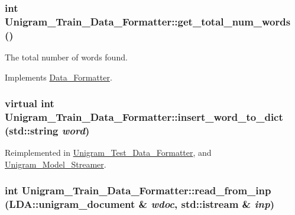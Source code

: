 \hypertarget{class_unigram___train___data___formatter_a89a89ebbf1d42f49f4e2f86307d47bb8}{
\subsubsection[{get\_\-total\_\-num\_\-words}]{\setlength{\rightskip}{0pt plus 5cm}int Unigram\_\-Train\_\-Data\_\-Formatter::get\_\-total\_\-num\_\-words ()}}
\label{class_unigram___train___data___formatter_a89a89ebbf1d42f49f4e2f86307d47bb8}


The total number of words found. 



Implements \hyperlink{class_data___formatter_aec312da75df72aa23974051db72e4b69}{Data\_\-Formatter}.

\hypertarget{class_unigram___train___data___formatter_a0023886209f7fd1441a256238c86844a}{
\subsubsection[{insert\_\-word\_\-to\_\-dict}]{\setlength{\rightskip}{0pt plus 5cm}virtual int Unigram\_\-Train\_\-Data\_\-Formatter::insert\_\-word\_\-to\_\-dict (std::string {\em word})}}
\label{class_unigram___train___data___formatter_a0023886209f7fd1441a256238c86844a}


Reimplemented in \hyperlink{class_unigram___test___data___formatter_a0bbe30a897b9e2a01795ef3ccae38612}{Unigram\_\-Test\_\-Data\_\-Formatter}, and \hyperlink{class_unigram___model___streamer_a51a09e569da02b64cec4a551cc4f3ba0}{Unigram\_\-Model\_\-Streamer}.

\hypertarget{class_unigram___train___data___formatter_ac4ef66ddab566b3293bdb659e8ac8c58}{
\subsubsection[{read\_\-from\_\-inp}]{\setlength{\rightskip}{0pt plus 5cm}int Unigram\_\-Train\_\-Data\_\-Formatter::read\_\-from\_\-inp (LDA::unigram\_\-document \& {\em wdoc}, \/  std::istream \& {\em inp})}}
\label{class_unigram___train___data___formatter_ac4ef66ddab566b3293bdb659e8ac8c58}


